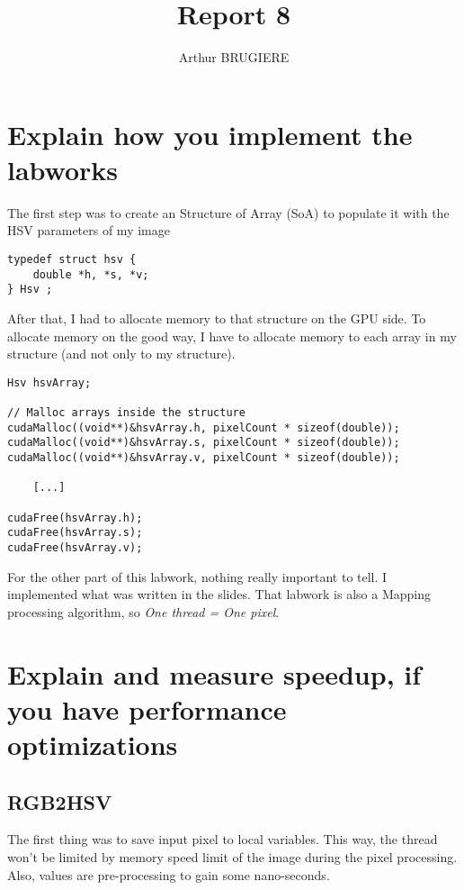 \documentclass[11pt]{article} %
\title{Report 8}
\author{Arthur BRUGIERE}
\begin{document}
\maketitle

\section{Explain how you implement the labworks}

The first step was to create an Structure of Array (SoA) to populate it with the HSV parameters of my image

\begin{lstlisting}[style=CStyle]
typedef struct hsv {
    double *h, *s, *v;
} Hsv ;
\end{lstlisting}

After that, I had to allocate memory to that structure on the GPU side. To allocate memory on the good way, I have to allocate memory to each array in my structure (and not only to my structure). 

\begin{lstlisting}[style=CStyle]
Hsv hsvArray;

// Malloc arrays inside the structure
cudaMalloc((void**)&hsvArray.h, pixelCount * sizeof(double));
cudaMalloc((void**)&hsvArray.s, pixelCount * sizeof(double));
cudaMalloc((void**)&hsvArray.v, pixelCount * sizeof(double));

	[...]

cudaFree(hsvArray.h);
cudaFree(hsvArray.s);
cudaFree(hsvArray.v);
\end{lstlisting}

For the other part of this labwork, nothing really important to tell. I implemented what was written in the slides. That labwork is also a Mapping processing algorithm, so {\it One thread = One pixel}.

\section{Explain and measure speedup, if you have performance optimizations}

\subsection{RGB2HSV}

The first thing was to save input pixel to local variables. This way, the thread won't be limited by memory speed limit of the image during the pixel processing. Also, values are pre-processing to gain some nano-seconds.
\end{document}
